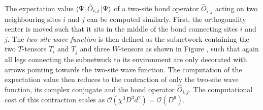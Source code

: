 The expectation value $\bra{\Psi}\hat{O}_{i,j}\ket{\Psi}$ of a two-site bond operator $\hat{O}_{i,j}$ acting on two neighbouring sites $i$ and $j$ can be computed similarly. First, the orthogonality center is moved such that it sits in the middle of the bond connecting sites $i$ and $j$. The \textit{two-site wave function} is then defined as the subnetwork containing the two $T$-tensors $T_i$ and $T_j$ and three $W$-tensors as shown in Figure , such that again all legs connecting the subnetwork to its environment are only decorated with arrows pointing towards the two-site wave function. The computation of the expectation value then reduces to the contraction of only the two-site wave function, its complex conjugate and the bond operator $\hat{O}_{i,j}$. The computational cost of this contraction scales as $\mathcal{O}\left(\chi^3D^3d^2\right) = \mathcal{O}(D^6)$.